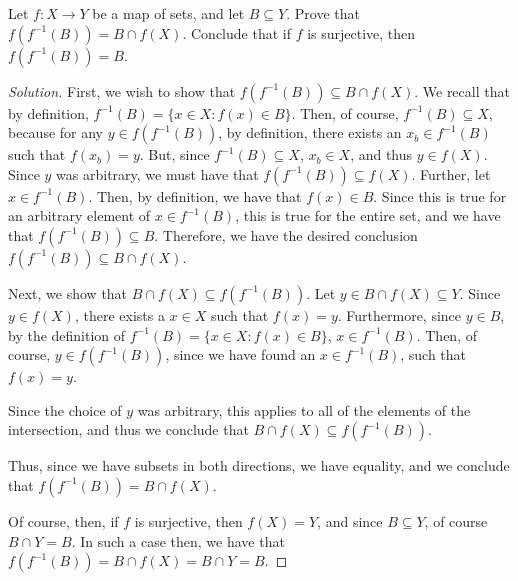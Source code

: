 \documentclass[10pt]{article}
\newenvironment{problem}[2][]{\begin{trivlist}
\item[\hskip \labelsep {\bfseries #1}\hskip \labelsep {\bfseries #2.}]}{\end{trivlist}}
\begin{document}
\begin{problem}{Question 5}

Let $f: X \to Y$ be a map of sets, and let $B \subseteq Y$. Prove that $f(f^{-1}(B)) = B \cap f(X)$. Conclude that if $f$ is surjective, then $f(f^{-1}(B)) = B$.

\end{problem}

\begin{proof}[Solution]

First, we wish to show that $f(f^{-1}(B)) \subseteq B \cap f(X)$. We recall that by definition, $f^{-1}(B) = \{ x \in X : f(x) \in B \}$. Then, of course, $f^{-1}(B) \subseteq X$, because for any $y \in f(f^{-1}(B))$, by definition, there exists an $x_b \in f^{-1}(B)$ such that $f(x_b) = y$. But, since $f^{-1}(B) \subseteq X$, $x_b \in X$, and thus $y \in f(X)$. Since $y$ was arbitrary, we must have that $f(f^{-1}(B)) \subseteq f(X)$. Further, let $x \in f^{-1}(B)$. Then, by definition, we have that $f(x) \in B$. Since this is true for an arbitrary element of $x \in f^{-1}(B)$, this is true for the entire set, and we have that $f(f^{-1}(B)) \subseteq B$. Therefore, we have the desired conclusion $f(f^{-1}(B)) \subseteq B \cap f(X)$.

Next, we show that $B \cap f(X) \subseteq f(f^{-1}(B))$. Let $y \in B \cap f(X) \subseteq Y$. Since $y \in f(X)$, there exists a $x \in X$ such that $f(x) = y$. Furthermore, since $y \in B$, by the definition of $f^{-1}(B) =  \{ x \in X : f(x) \in B \}$, $x \in f^{-1}(B)$. Then, of course, $y \in  f(f^{-1}(B))$, since we have found an $x \in f^{-1}(B)$, such that $f(x) = y$.

Since the choice of $y$ was arbitrary, this applies to all of the elements of the intersection, and thus we conclude that $B \cap f(X) \subseteq f(f^{-1}(B))$.

Thus, since we have subsets in both directions, we have equality, and we conclude that $f(f^{-1}(B)) = B \cap f(X)$.

Of course, then, if $f$ is surjective, then $f(X) = Y$, and since $B \subseteq Y$, of course $B \cap Y = B$. In such a case then, we have that $f(f^{-1}(B)) = B \cap f(X) = B \cap Y = B$.

\end{proof}
\end{document}
